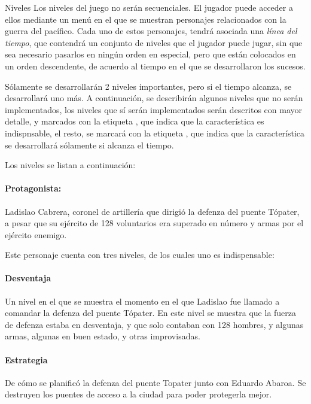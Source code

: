 \begin{subsection}{Niveles}
  Los niveles del juego no serán secuenciales. El jugador puede acceder a ellos mediante un menú en el que se muestran personajes relacionados con la guerra del pacífico. Cada uno de estos personajes, tendrá asociada una \textit{línea del tiempo}, que contendrá un conjunto de niveles que el jugador puede jugar, sin que sea necesario pasarlos en ningún orden en especial, pero que están colocados en un orden descendente, de acuerdo al tiempo en el que se desarrollaron los sucesos.
  
  Sólamente se desarrollarán 2 niveles importantes, pero si el tiempo alcanza, se desarrollará uno más. A continuación, se describirán algunos niveles que no serán implementados, los niveles que sí serán implementados serán descritos con mayor detalle, y marcados con la etiqueta \indispensable, que indica que la característica es indispnsable, el resto, se marcará con la etiqueta \talvez, que indica que la característica se desarrollará sólamente si alcanza el tiempo.

  Los niveles se listan a continuación:

  \paragraph{Protagonista: } Ladislao Cabrera, coronel de artillería que dirigió la defenza del puente Tópater, a pesar que su ejército de 128 voluntarios era superado en número y armas por el ejército enemigo.
  
  Este personaje cuenta con tres niveles, de los cuales uno es indispensable:

  \paragraph{Desventaja} \talvez Un nivel en el que se muestra el momento en el que Ladislao fue llamado a comandar la defenza del puente Tópater. En este nivel se muestra que la fuerza de defenza estaba en desventaja, y que solo contaban con 128 hombres, y algunas armas, algunas en buen estado, y otras improvisadas.

  \paragraph{Estrategia} \talvez De cómo se planificó la defenza del puente Topater junto con Eduardo Abaroa. Se destruyen los puentes de acceso a la ciudad para poder protegerla mejor.

  

\end{subsection}
